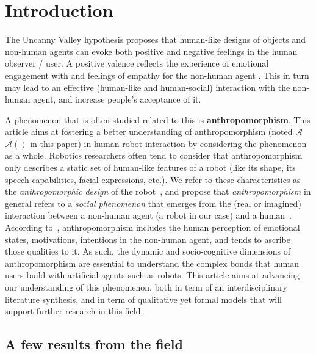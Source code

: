 \documentclass{frontiersSCNS} %
\newcommand{\Ant}[1][]{%
      \ifthenelse{\isempty{#1}}%
        {$\mathcal{A}$}
        {$\mathcal{A}(#1)$}
}
\begin{document}
%
%
%
%
%
%


\section{Introduction}
\label{sec:intro}

The Uncanny Valley hypothesis \citep{mori_uncanny_1970} proposes that human-like
designs of objects and non-human agents can evoke both positive and negative
feelings in the human observer / user. A positive valence reflects the
experience of emotional engagement with and feelings of empathy for the
non-human agent \citep{cheetham_human_2011}. This in turn may lead to an
effective (human-like and human-social) interaction with the non-human agent,
and increase people's acceptance of it. 

A phenomenon that is often studied related to this is \textbf{anthropomorphism}.
This article aims at fostering a better understanding of anthropomorphism (noted
\Ant in this paper) in human-robot interaction by considering the phenomenon as
a whole. Robotics researchers often tend to consider that anthropomorphism only
describes a static set of human-like features of a robot (like its shape, its
speech capabilities, facial expressions, etc.). We refer to these
characteristics as the \emph{anthropomorphic design} of the
robot~\citep{fink_anthropomorphism_2012}, and propose that
\emph{anthropomorphism} in general refers to a \emph{social phenomenon} that
emerges from the (real or imagined) interaction between a non-human agent (a
robot in our case) and a human~\citep{persson_anthropomorphism_2000}.  According
to~\cite{epley_when_2008}, anthropomorphism includes the human perception of
emotional states, motivations, intentions in the non-human agent, and tends to
ascribe those qualities to it.  As such, the dynamic and socio-cognitive
dimensions of anthropomorphism are essential to understand the complex bonds
that human users build with artificial agents such as robots. This article aims
at advancing our understanding of this phenomenon, both in term of an
interdisciplinary literature synthesis, and in term of qualitative yet formal
models that will support further research in this field.

\subsection{A few results from the field}
\label{sec:field-results}
\end{document}
